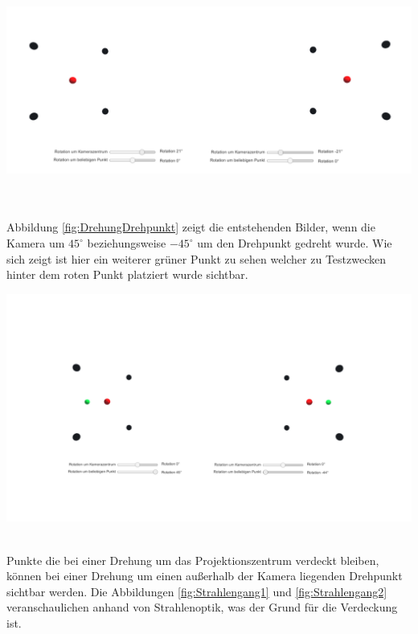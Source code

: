 \begin{minipage}{\linewidth}
	\centering
	\includegraphics[width=1.\linewidth]{images/DrehungPZ.png}
	\label{fig:DrehungProjektionszentrum}
\end{minipage}\\ \\

Abbildung \ref{fig:DrehungDrehpunkt} zeigt die entstehenden Bilder, wenn die Kamera um \ensuremath{45^\circ} beziehungsweise \ensuremath{-45^\circ} um den Drehpunkt gedreht wurde. Wie sich zeigt ist hier ein weiterer grüner Punkt zu sehen welcher zu Testzwecken hinter dem roten Punkt platziert wurde sichtbar.

\begin{minipage}{\linewidth}
	\centering
	\includegraphics[width=1.\linewidth]{images/DrehungDZ.png}
	\label{fig:DrehungDrehpunkt}
\end{minipage}\\ 

Punkte die bei einer Drehung um das Projektionszentrum verdeckt bleiben, können bei einer Drehung um einen außerhalb der Kamera liegenden Drehpunkt sichtbar werden. Die Abbildungen \ref{fig:Strahlengang1} und \ref{fig:Strahlengang2} veranschaulichen anhand von Strahlenoptik, was der Grund für die Verdeckung ist. \\


